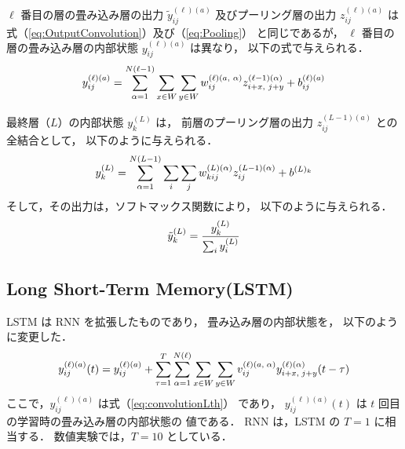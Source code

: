 $\ell$ 番目の層の畳み込み層の出力 $\tilde{y}_{ij}^{(\ell)(a)}$
及びプーリング層の出力
$z^{(\ell)(a)}_{ij}$
は式（\ref{eq:OutputConvolution}）及び（\ref{eq:Pooling}）
と同じであるが，
$\ell$ 番目の層の畳み込み層の内部状態 $y^{(\ell)(a)}_{ij}$ は異なり，
以下の式で与えられる．
\vspace{-2mm}
\begin{equation}
\footnotesize
  y^{(\ell) (a)}_{ij} = \sum_{\alpha=1}^{N(\ell - 1)} \sum_{x \in W} \sum_{y \in W}
     w^{(\ell)(a,\ \alpha)}_{ij} z^{(\ell - 1)(\alpha)}_{i + x,\ j + y}
         + b^{(\ell)(a)}_{ij}
  \label{eq:convolutionLth}
\end{equation}
\vspace{-2mm}

最終層（$L$）の内部状態 $y^{(L)}_{k}$ は，
前層のプーリング層の出力 $z^{(L - 1)(a)}_{ij}$ との全結合として，
以下のように与えられる．
\vspace{-2mm}
\begin{equation}
  \footnotesize
  y^{(L)}_{k} = \sum_{\alpha=1}^{N(L - 1)} \sum_{i} \sum_{j}
     w^{(L)(\alpha)}_{kij} z^{(L - 1)(\alpha)}_{ij}
         + b^{(L)_k}
  \label{eq:OutputInternal}
\end{equation}
そして，その出力は，ソフトマックス関数により，
以下のように与えられる．
\vspace{-2mm}
\begin{equation}
  \footnotesize
\tilde{y}_{k}^{(L)} = \frac{y^{(L)}_{k}}{\sum_i y^{(L)}_{i}}
  \label{eq:Output}
\end{equation}

%
\vspace{-9mm}
\subsection{Long Short-Term Memory(LSTM)}
\vspace{-3mm}
%
LSTM は RNN を拡張したものであり，
畳み込み層の内部状態を，
以下のように変更した．
\vspace{-2mm}
\begin{equation}
\tiny
  y^{(\ell) (a)}_{ij}(t) = y^{(\ell) (a)}_{ij} +
  \sum_{\tau = 1}^T \sum_{\alpha=1}^{N(\ell)} \sum_{x \in W} \sum_{y \in W}
  v^{(\ell)(a,\ \alpha)}_{ij}
  y^{(\ell)(\alpha)}_{i + x,\ j + y}(t - \tau)
  \label{eq:LSTM}
\end{equation}
\vspace{-1mm}
\noindent 
ここで，$y^{(\ell) (a)}_{ij}$ は式（\ref{eq:convolutionLth}） であり，
$ y^{(\ell) (a)}_{ij}(t)$ は $t$ 回目の学習時の畳み込み層の内部状態の
値である．
RNN は，LSTM の $T = 1$ に相当する．
数値実験では，$T = 10$ としている．
%
